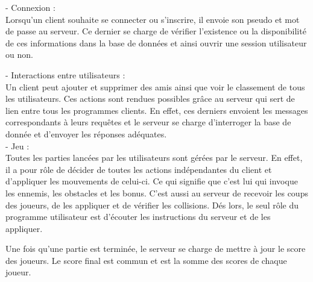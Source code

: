 \documentclass[a4paper,12pt]{article}
\begin{document}
- Connexion : \\
Lorsqu'un client souhaite se connecter ou s'inscrire, il envoie son pseudo et mot de passe au serveur. Ce dernier se charge de vérifier l'existence ou la disponibilité de ces informations dans la base de données et ainsi ouvrir une session utilisateur ou non. 

- Interactions entre utilisateurs : \\
Un client peut ajouter et supprimer des amis ainsi que voir le classement de tous les utilisateurs. 
Ces actions sont rendues possibles grâce au serveur qui sert de lien entre tous les programmes clients. 
En effet, ces derniers envoient les messages correspondants à leurs requêtes et le serveur se charge d'interroger la base de donnée et d'envoyer les réponses adéquates. \\

- Jeu : \\
Toutes les parties lancées par les utilisateurs sont gérées par le serveur. En effet, il a pour rôle de décider de toutes les actions indépendantes du client et d'appliquer les mouvements de celui-ci.
Ce qui signifie que c'est lui qui invoque les ennemis, les obstacles et les bonus. C'est aussi au serveur de recevoir les coups des joueurs, de les appliquer et de vérifier les collisions.
Dés lors, le seul rôle du programme utilisateur est d'écouter les instructions du serveur et de les appliquer. 

Une fois qu'une partie est terminée, le serveur se charge de mettre à jour le score des joueurs. Le score final est commun et est la somme des scores de chaque joueur.
\end{document}

